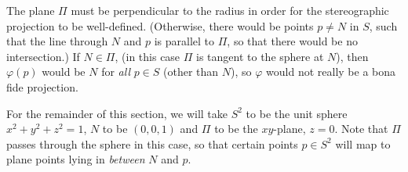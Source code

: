 \documentclass[leqno]{book}
\begin{document}
\noindent The plane $\Pi$ must be perpendicular to the radius in order for the stereographic projection to be well-defined.  (Otherwise, there would be points $p\ne N$ in $S$, such that the line through $N$ and $p$ is parallel to $\Pi$, so that there would be no intersection.)  If $N\in\Pi$, (in this case $\Pi$ is tangent to the sphere at $N$), then $\varphi(p)$ would be $N$ for \emph{all} $p\in S$ (other than $N$), so $\varphi$ would not really be a bona fide projection.

For the remainder of this section, we will take $S^2$ to be the unit sphere $x^2+y^2+z^2=1$, $N$ to be $(0,0,1)$ and $\Pi$ to be the $xy$-plane, $z=0$.  %
Note that $\Pi$ passes through the sphere in this case, so that certain points $p\in S^2$ will map to plane points lying in \emph{between} $N$ and $p$.
\end{document}

